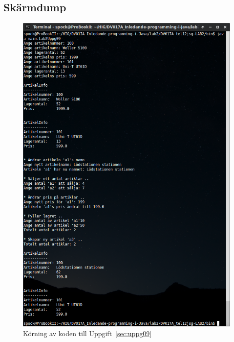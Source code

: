\subsection{Skärmdump}
\begin{figure}[htbp]
    \centering
        \includegraphics[width=\linewidth]{img/09.png}
    \caption{Körning av koden till Uppgift~\ref{sec:uppg09}}
    \label{fig:uppg09-screenshot}
\end{figure}

